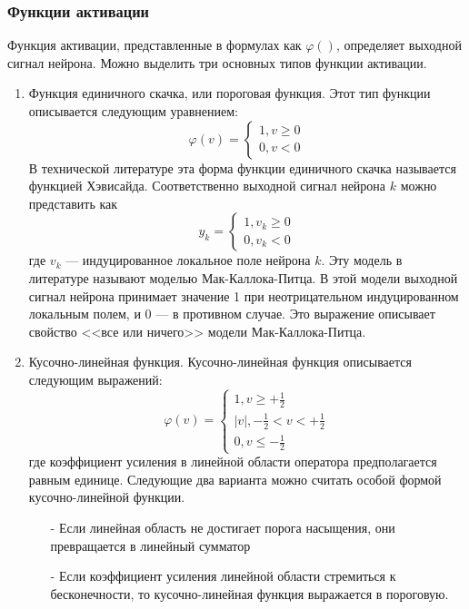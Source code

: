 \subsubsection{Функции активации}
Функция активации, представленные в формулах как $\varphi()$, определяет выходной сигнал нейрона.
Можно выделить три основных типов функции активации.
\begin{enumerate}
\item Функция единичного скачка, или пороговая функция.
Этот тип функции описывается следующим уравнением:
\begin{equation}
\varphi(v) = 
\begin{cases}
1, v \ge 0\\
0, v < 0
\end{cases}
\end{equation}
В технической литературе эта форма функции единичного скачка называется функцией Хэвисайда.
Соответственно выходной сигнал нейрона $k$ можно представить как
\begin{equation}
y_k = 
\begin{cases}
1, v_k \ge 0\\
0, v_k < 0
\end{cases}
\end{equation}
где $v_k$ --- индуцированное локальное поле нейрона $k$.
Эту модель в литературе называют моделью Мак-Каллока-Питца. В этой модели выходной сигнал нейрона принимает значение 1 при неотрицательном индуцированном локальным полем, и 0 --- в противном случае.
Это выражение описывает свойство <<все или ничего>> модели Мак-Каллока-Питца.
\item Кусочно-линейная функция. Кусочно-линейная функция описывается следующим выражений:
\begin{equation}
\varphi(v) = 
\begin{cases}
1, v \ge +\frac12\\
|v|, -\frac12<v<+\frac12\\
0, v \le -\frac12
\end{cases}
\end{equation}
где коэффициент усиления в линейной области оператора предполагается равным единице.
Следующие два варианта можно считать особой формой кусочно-линейной функции.
\begin{itemize}
\item [-] Если линейная область не достигает порога насыщения, они превращается в линейный сумматор 
\item [-] Если коэффициент усиления линейной области стремиться к бесконечности, то кусочно-линейная функция выражается в пороговую.

\end{itemize}
\end{enumerate}
